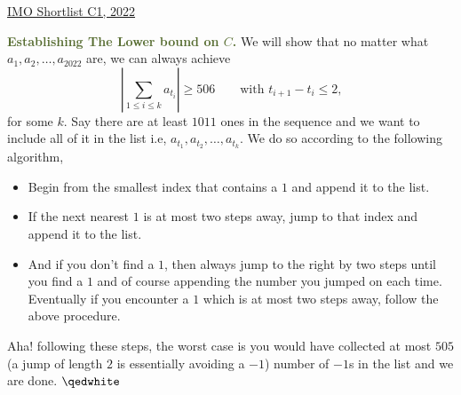 \begin{problem}{1}{\href{https://artofproblemsolving.com/community/q1h3107334p34892180}{IMO Shortlist C1, 2022}}
\begin{solution}
	\noindent \textbf{\textcolor{darkolivegreen}{Establishing The Lower bound on $C$.}} We will show that no matter what $a_1,a_2,\ldots, a_{2022}$ are, we can always achieve
$$\left|\sum_{1\le i\le k}a_{t_i}\right|\ge 506 \qquad\text{with $t_{i+1}-t_i\le 2$,}$$for some $k$. Say there are at least $1011$ ones in the sequence and we want to include all of it in the list i.e, $a_{t_1}, a_{t_2}, \ldots, a_{t_k}.$ We do so according to the following algorithm,
	\begin{itemize}
		\item Begin from the smallest index that contains a $1$ and append it to the list.
		\item If the next nearest $1$ is at most two steps away, jump to that index and append it to the list.
		\item And if you don't find a $1$, then always jump to the right by two steps until you find a $1$ and of course appending the number you jumped on each time. Eventually if you encounter a $1$ which is at most two steps away, follow the above procedure.
	\end{itemize}
	\indent Aha! following these steps, the worst case is you would have collected at most $505$ (a jump of length $2$ is essentially avoiding a $-1$) number of $-1$s in the list and we are done. $\qedwhite$
	\end{solution}
\end{problem}

